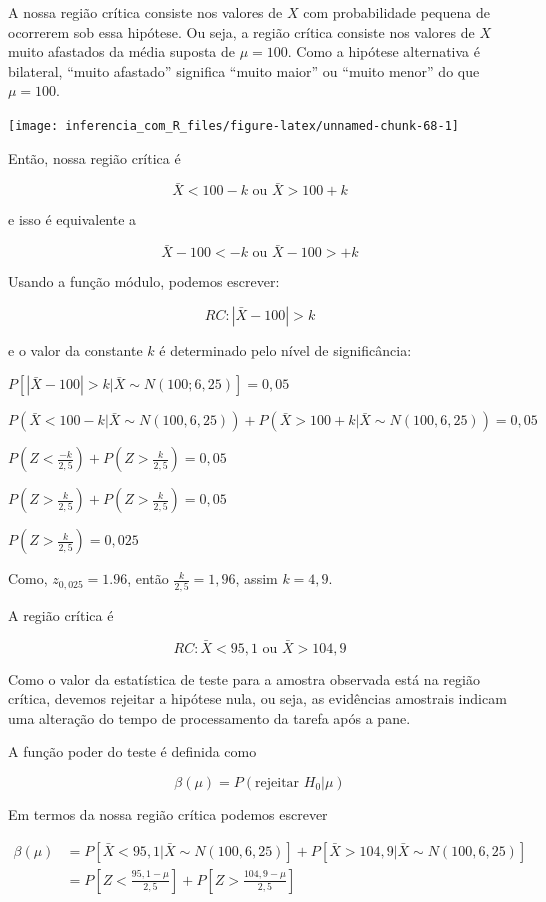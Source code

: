 \documentclass[
]{book}
\begin{document}
A nossa região crítica consiste nos valores de \(X\) com probabilidade pequena de ocorrerem sob essa hipótese. Ou seja, a região crítica consiste nos valores de \(X\) muito afastados da média suposta de \(\mu=100\). Como a hipótese alternativa é bilateral, ``muito afastado'' significa ``muito maior'' ou ``muito menor'' do que \(\mu=100\).

\begin{center}\texttt{[image: inferencia\_com\_R\_files/figure-latex/unnamed-chunk-68-1]} \end{center}

Então, nossa região crítica é

\[\bar X < 100-k \text{  ou  } \bar X  > 100+k\]

e isso é equivalente a

\[\bar X -100 < -k \text{  ou  } \bar X -100 > +k\]

Usando a função módulo, podemos escrever:

\[RC: |\bar X -100|>k\]

e o valor da constante \(k\) é determinado pelo nível de significância:

\(P\left[|\bar X -100|>k\Big|\bar X \sim N\left(100;6,25\right)\right] = 0,05\)

\(P\left(\bar X < 100-k|\bar X \sim N(100,6,25)\right)+P\left(\bar X > 100+k|\bar X \sim N(100,6,25)\right) = 0,05\)

\(P\left(Z<\frac{-k}{2,5}\right)+P\left(Z>\frac{k}{2,5}\right) = 0,05\)

\(P\left(Z>\frac{k}{2,5}\right)+P\left(Z>\frac{k}{2,5}\right) = 0,05\)

\(P\left(Z>\frac{k}{2,5}\right) = 0,025\)

Como, \(z_{0,025}=1.96\), então \(\frac{k}{2,5}=1,96\), assim \(k=4,9\).

A região crítica é

\[RC: \bar X<95,1\text{  ou  }\bar X>104,9\]

Como o valor da estatística de teste para a amostra observada está na região crítica, devemos rejeitar a hipótese nula, ou seja, as evidências amostrais indicam uma alteração do tempo de processamento da tarefa após a pane.

A função poder do teste é definida como

\[\beta(\mu)=P(\text{rejeitar } H_0|\mu)\]

Em termos da nossa região crítica podemos escrever

\[
\begin{aligned}
\beta(\mu)&= P\left[\bar X<95,1 |\bar X \sim N(100,6,25)\right] + P\left[\bar X>104,9 |\bar X \sim N(100,6,25)\right] \\
&=P\left[Z<\frac{95,1-\mu}{2,5}\right]+P\left[Z>\frac{104,9-\mu}{2,5}\right]
\end{aligned}
\]
\end{document}
